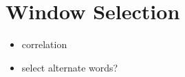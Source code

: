 \section{Window Selection}
\label{sec:window}

\begin{itemize}
  \item correlation
  \item select alternate words?
\end{itemize}
